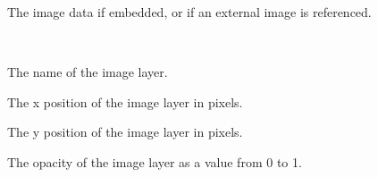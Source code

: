 \documentclass[letterpaper,10pt,english]{sphinxmanual}
\begin{document}
\begin{fulllineitems}
\begin{fulllineitems}
\end{fulllineitems}


\begin{fulllineitems}
\label{index:tmx.Image.data}
The image data if embedded, or  if an external image
is referenced.

\end{fulllineitems}


\end{fulllineitems}


\begin{fulllineitems}
\label{index:tmx.ImageLayer}~

\begin{fulllineitems}
\label{index:tmx.ImageLayer.name}
The name of the image layer.

\end{fulllineitems}


\begin{fulllineitems}
\label{index:tmx.ImageLayer.offsetx}
The x position of the image layer in pixels.

\end{fulllineitems}


\begin{fulllineitems}
\label{index:tmx.ImageLayer.offsety}
The y position of the image layer in pixels.

\end{fulllineitems}


\begin{fulllineitems}
\label{index:tmx.ImageLayer.opacity}
The opacity of the image layer as a value from 0 to 1.

\end{fulllineitems}


\end{fulllineitems}
\end{document}
